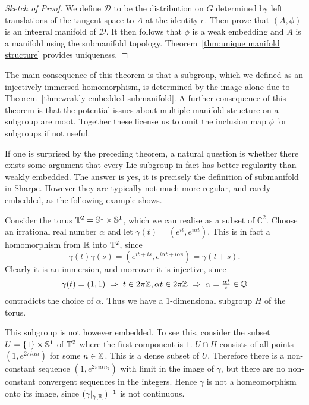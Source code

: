 \begin{proof}[Sketch of Proof]
We define $\mathcal{D}$ to be the distribution on $G$ determined by left translations of the tangent space to $A$ at the identity $e$. 
Then prove that $(A,\phi)$ is an integral manifold of $\mathcal{D}$. 
It then follows that $\phi$ is a weak embedding and $A$ is a manifold using the submanifold topology.
Theorem~\ref{thm:unique manifold structure} provides uniqueness.
\end{proof}

The main consequence of this theorem is that a subgroup, which we defined as an injectively immersed homomorphism, is determined by the image alone due to Theorem~\ref{thm:weakly embedded submanifold}.
A further consequence of this theorem is that the potential issues about multiple manifold structure on a subgroup are moot.
Together these license us to omit the inclusion map $\phi$ for subgroups if not useful.

If one is surprised by the preceding theorem, a natural question is whether there exists some argument that every Lie subgroup in fact has better regularity than weakly embedded.
The answer is yes, it is precisely the definition of submanifold in Sharpe.
However they are typically not much more regular, and rarely embedded, as the following example shows.

\begin{example}
Consider the torus $\mathbb{T}^2 = \mathbb{S}^1 \times \mathbb{S}^1$, which we can realise as a subset of $\mathbb{C}^2$.
Choose an irrational real number $\alpha$ and let $\gamma(t) = (e^{it}, e^{i\alpha t})$.
This is in fact a homomorphism from $\mathbb{R}$ into $\mathbb{T}^2$, since
\[
\gamma(t)\gamma(s)
= (e^{it+is}, e^{i\alpha t+i\alpha s})
= \gamma(t+s).
\]
Clearly it is an immersion, and moreover it is injective, since
\[
\gamma(t) = (1,1)
\;\Rightarrow\;
t \in 2\pi\mathbb{Z}, \alpha t \in 2\pi\mathbb{Z}
\;\Rightarrow\;
\alpha = \tfrac{\alpha t}{t} \in \mathbb{Q}
\]
contradicts the choice of $\alpha$.
Thus we have a $1$-dimensional subgroup $H$ of the torus.

This subgroup is not however embedded.
To see this, consider the subset $U = \{1\}\times\mathbb{S}^1$ of $\mathbb{T}^2$ where the first component is $1$.
$U \cap H$ consists of all points $(1, e^{2\pi i\alpha n})$ for some $n \in \mathbb{Z}$.
This is a dense subset of $U$.
Therefore there is a non-constant sequence $(1, e^{2\pi i\alpha n_k})$ with limit in the image of $\gamma$, but there are no non-constant convergent sequences in the integers.
Hence $\gamma$ is not a homeomorphism onto its image, since $(\gamma|_{\gamma[\mathbb{R}]})^{-1}$ is not continuous.
\end{example}

